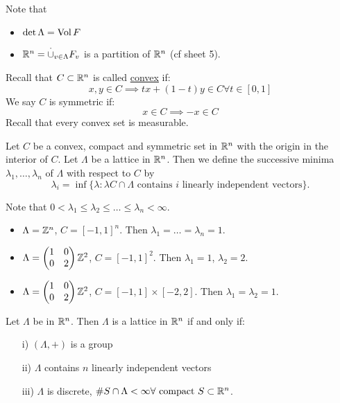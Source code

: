 \documentclass[NumTh.tex]{subfiles}
\begin{document}
Note that
\begin{itemize}
  \item $\det \Lambda = \operatorname{Vol} F$
  \item $\mathbb{R}^n = \overset{\cdot}{\cup}_{v \in \Lambda} F_v$ is a partition of $\mathbb{R}^n$ (cf sheet 5).
\end{itemize}

Recall that $C \subset \mathbb{R}^n$ is called \underline{convex} if:
\[ x,y \in C \implies tx + (1-t)y \in C \forall t \in [0,1] \]
We say $C$ is symmetric if:
\[ x \in C \implies -x \in C\]
Recall that every convex set is measurable.

Let $C$ be a convex, compact and symmetric set in $\mathbb{R}^n$ with the origin in the interior of $C$.
Let $\Lambda$ be a lattice in $\mathbb{R}^n$.
Then we define the successive minima $\lambda_1,\dots,\lambda_n$ of $\Lambda$ with respect to $C$ by
\[ \lambda_i = \inf \{ \lambda : \lambda C \cap \Lambda \text{ contains } i \text{ linearly independent vectors} \} \text{.} \]

Note that $0 < \lambda_1 \leq \lambda_2 \leq \dots \leq \lambda_n < \infty$.

\begin{ex}
  \begin{itemize}
    \item $\Lambda = \mathbb{Z}^n$, $C = [-1,1]^n$.
    Then $\lambda_1 = \dots = \lambda_n = 1$.
    \item $\Lambda = \left(
    \begin{matrix}
      1 & 0 \\
      0 & 2
    \end{matrix}
    \right) \mathbb{Z}^2$, $C = [-1,1]^2$.
    Then $\lambda_1 = 1$, $\lambda_2 = 2$.
    \item $\Lambda = \left(
    \begin{matrix}
      1 & 0 \\
      0 & 2
    \end{matrix}
    \right) \mathbb{Z}^2$, $C = [-1,1] \times [-2,2]$.
    Then $\lambda_1 = \lambda_2 = 1$.
  \end{itemize}
\end{ex}

\begin{theorem}\label{th_2_1_2}
  Let $\Lambda$ be in $\mathbb{R}^n$. Then $\Lambda$ is a lattice in $\mathbb{R}^n$ if and only if:
  \begin{enumerate}
    \item[i)\label{th_2_1_2_1}] $(\Lambda,+)$ is a group
    \item[ii)\label{th_2_1_2_2}] $\Lambda$ contains $n$ linearly independent vectors
    \item[iii)\label{th_2_1_2_3}] $\Lambda$ is discrete, $\# S \cap \Lambda < \infty \forall \text{ compact } S \subset \mathbb{R}^n$.
  \end{enumerate}
\end{theorem}
\end{document}

